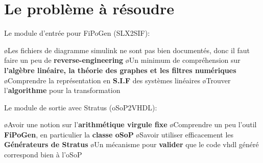 \section{Le problème à résoudre}

\begin{frame} 
	Le module d'entrée pour FiPoGen (SLX2SIF):
	\begin{center}
	\end{center}
    \BI
	\o Les fichiers de diagramme simulink ne sont pas bien documentés, donc il faut faire un peu de \textbf{reverse-engineering}
    \o Un minimum de compréhension sur \textbf{l'algèbre linéaire, la théorie des graphes et les filtres numériques}
	\o Comprendre la représentation en \textbf{S.I.F} des systèmes linéaires
	\o Trouver l'\textbf{algorithme} pour la transformation
    \EI
\end{frame} 
%
\begin{frame} 
	Le module de sortie avec Stratus (oSoP2VHDL):
	\begin{center}
	\end{center}
    \BI
    \o Avoir une notion sur l'\textbf{arithmétique virgule fixe} 
	\o Comprendre un peu l'outil \textbf{FiPoGen}, en particulier la \textbf{classe oSoP} 
	\o Savoir utiliser efficacement les \textbf{Générateurs de Stratus}
	\o Un mécanisme pour \textbf{valider} que le code vhdl généré correspond bien à l'oSoP 
    \EI
\end{frame}
